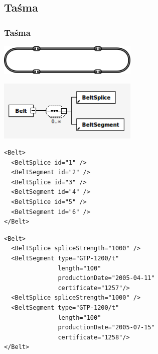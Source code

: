 \documentclass{beamer}
\begin{document}
\subsection{Taśma}
\begin{frame}
\frametitle{Taśma}
\begin{center}
\includegraphics[width=0.5\textwidth]{png/tasma}

\pause

\includegraphics[width=0.5\textwidth]{png/tasma_xsd}
\end{center}
\end{frame}

\begin{frame}[fragile]
\begin{verbatim}
<Belt>
  <BeltSplice id="1" />
  <BeltSegment id="2" />
  <BeltSplice id="3" />
  <BeltSegment id="4" />
  <BeltSplice id="5" />
  <BeltSegment id="6" />
</Belt>
\end{verbatim}
\end{frame}

\begin{frame}[fragile]
\begin{verbatim}
<Belt>
  <BeltSplice spliceStrength="1000" />
  <BeltSegment type="GTP-1200/t"
               length="100"
               productionDate="2005-04-11"
               certificate="1257"/>
  <BeltSplice spliceStrength="1000" />
  <BeltSegment type="GTP-1200/t"
               length="100"
               productionDate="2005-07-15"
               certificate="1258"/>
</Belt>
\end{verbatim}
\end{frame}
\end{document}
